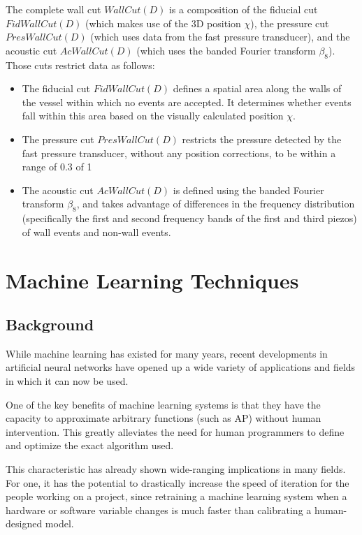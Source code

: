 \documentclass[10pt]{article}
\begin{document}
The complete wall cut $WallCut(D)$ is a composition of the fiducial cut $FidWallCut(D)$ (which makes use of the 3D position $\chi$), the pressure cut $PresWallCut(D)$ (which uses data from the fast pressure transducer), and the acoustic cut $AcWallCut(D)$ (which uses the banded Fourier transform $\beta _{8}$). Those cuts restrict data as follows:

\begin{itemize}
    \item The fiducial cut $FidWallCut(D)$ defines a spatial area along the walls of the vessel within which no events are accepted. It determines whether events fall within this area based on the visually calculated position $\chi$.
    \item The pressure cut $PresWallCut(D)$ restricts the pressure detected by the fast pressure transducer, without any position corrections, to be within a range of 0.3 of 1
    \item The acoustic cut $AcWallCut(D)$ is defined using the banded Fourier transform $\beta_{8}$, and takes advantage of differences in the frequency distribution (specifically the first and second frequency bands of the first and third piezos) of wall events and non-wall events.
\end{itemize}

\section{Machine Learning Techniques}

\subsection{Background}

While machine learning has existed for many years, recent developments in artificial neural networks have opened up a wide variety of applications and fields in which it can now be used.

One of the key benefits of machine learning systems is that they have the capacity to approximate arbitrary functions (such as AP) without human intervention. This greatly alleviates the need for human programmers to define and optimize the exact algorithm used.

This characteristic has already shown wide-ranging implications in many fields. For one, it has the potential to drastically increase the speed of iteration for the people working on a project, since retraining a machine learning system when a hardware or software variable changes is much faster than calibrating a human-designed model.
\end{document}
